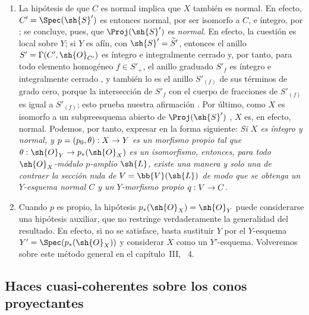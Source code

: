 \documentclass[oneside,10pt]{amsart}
\makeatletter
\newcommand{\ega@arrow}[2]{\mathchoice{#1}{#2}{#2}{#2}}
\renewcommand{\to}{\ega@arrow{\longrightarrow}{\rightarrow}}
\let\EGAOriginalLabel\label
\renewcommand{\label}[1]{\phantomsection\EGAOriginalLabel{#1}}
\makeatother
\begin{document}
\begin{remark}[8.11.8]
\label{II.8.11.8}
\begin{enumerate}
    \item[\rm{(i)}] La hipótesis de que $C$ es normal implica que $X$ también es normal.
        En efecto, $C'=\Spec(\sh{S}')$ es entonces normal, por ser isomorfo a $C$, e íntegro, por ;
        se concluye, pues, que $\Proj(\sh{S}')$ es \emph{normal}.
        En efecto, la cuestión es local sobre $Y$;
        si $Y$ es afín, con $\sh{S}'=\widetilde S'$, entonces el anillo $S'=\Gamma(C',\sh{O}_{C'})$ es íntegro e integralmente cerrado  y, por tanto, para todo elemento homogéneo $f\in S'_+$, el anillo graduado $S'_f$ es íntegro e integralmente cerrado \cite[t.~I, p.~257 y 261]{I-13}, y también lo es el anillo $S'_{(f)}$ de sus términos de grado cero, porque la intersección de $S'_f$ con el cuerpo de fracciones de $S'_{(f)}$ es igual a $S'_{(f)}$;
        esto prueba nuestra afirmación .
        Por último, como $X$ es isomorfo a un subpreesquema abierto de $\Proj(\sh{S}')$ , $X$ es, en efecto, normal.
        Podemos, por tanto, expresar  en la forma siguiente:
        \emph{Si $X$ es íntegro y normal, y $p=(p_0,\theta):X\to Y$ es un morfismo propio tal que $\theta:\sh{O}_Y\to p_*(\sh{O}_X)$ es un isomorfismo, entonces, para todo $\sh{O}_X$-módulo $p$-amplio $\sh{L}$, existe una manera y solo una de contraer la sección nula de $V=\bb{V}(\sh{L})$ de modo que se obtenga un $Y$-esquema normal $C$ y un $Y$-morfismo propio $q:V\to C$.}
    \item[\rm{(ii)}] Cuando $p$ es propio, la hipótesis $p_*(\sh{O}_X)=\sh{O}_Y$ puede considerarse una hipótesis auxiliar, que no restringe verdaderamente la generalidad del resultado.
        En efecto, si no se satisface, basta sustituir $Y$ por el $Y$-esquema $Y'=\Spec(p_*(\sh{O}_X))$ y considerar $X$ como un $Y'$-esquema.
        Volveremos sobre este método general en el capítulo~III, \textsection~4.
\end{enumerate}
\end{remark}


\subsection{Haces cuasi-coherentes sobre los conos proyectantes}
\label{subsection:II.8.12}
\end{document}
